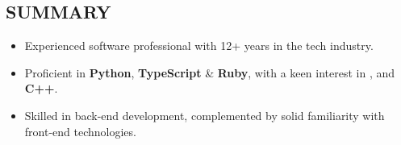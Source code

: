 \subsection*{SUMMARY}

\begin{itemize}[leftmargin=*,labelsep=1mm]
  \setlength{\parskip}{0mm}
  \setlength{\itemsep}{1mm}
  \item Experienced software professional with 12+ years in the tech industry.

  \item Proficient in \textbf{Python}, \textbf{TypeScript} \& \textbf{Ruby},
  with a keen interest in \href{https://github.com/xkpasswd/xkpasswd-rs}{},
  \href{https://github.com/ethan605/aws-vpn-client}{} and \textbf{C++}.

  \item Skilled in back-end development, complemented by solid familiarity with front-end technologies.
\end{itemize}
